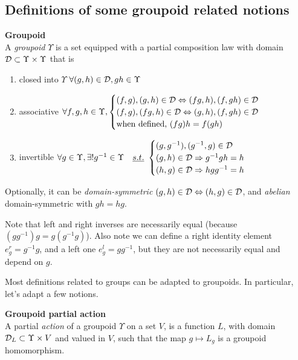 \subsection{Definitions of some groupoid related notions}

\begin{definition}\textbf{Groupoid}\\
A \emph{groupoid} $\Upsilon$ is a set equipped with a partial composition law with domain $\mathcal{D} \subset \Upsilon \times \Upsilon$ that is
\begin{enumerate}
	\item\label{enum:g1} closed into $\Upsilon$ \ie $\forall (g, h) \in \mathcal{D}, gh \in \Upsilon$
	\item\label{enum:g2} associative \ie
    $\forall f,g,h \in \Upsilon,
      \begin{cases}
        (f, g), (g, h) \in \mathcal{D} \Leftrightarrow (fg,h), (f, gh) \in \mathcal{D}\\
        (f, g), (fg, h) \in \mathcal{D} \Leftrightarrow (g,h), (f, gh) \in \mathcal{D}\\
        \text{when defined, } (fg)h = f(gh)
      \end{cases}$ \label{enum:2}
	\item\label{enum:g3} invertible \ie
		$\forall g \in \Upsilon, \exists! g^{-1} \in \Upsilon \quad\emph{s.t.}~
			\begin{cases}
				(g,g^{-1}), (g^{-1},g)  \in \mathcal{D}\\
				(g,h) \in \mathcal{D} \Rightarrow g^{-1}gh = h\\
				(h,g) \in \mathcal{D} \Rightarrow hgg^{-1} = h
			\end{cases}$
\end{enumerate}
Optionally, it can be \emph{domain-symmetric} \ie $(g,h) \in \mathcal{D} \Leftrightarrow (h,g) \in \mathcal{D}$, and \emph{abelian} \ie domain-symmetric with $gh = hg$.
\end{definition}

\begin{remark}
Note that left and right inverses are necessarily equal (because $(gg^{-1})g=g(g^{-1}g)$). Also note we can define a right identity element $e^r_g = g^{-1}g$, and a left one $e^l_g = gg^{-1}$, but they are not necessarily equal and depend on $g$.
\end{remark}

Most definitions related to groups can be adapted to groupoids. In particular, let's adapt a few notions.

\begin{definition}\textbf{Groupoid partial action}\\
A partial \emph{action} of a groupoid $\Upsilon$ on a set $V$, is a function $L$, with domain $\mathcal{D}_L \subset \Upsilon \times V$ and valued in $V$, such that the map $g \mapsto L_g$ is a groupoid homomorphism.
\end{definition}

